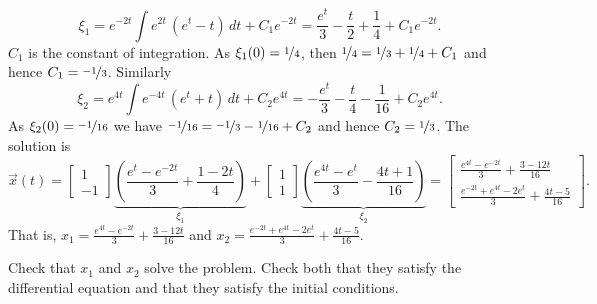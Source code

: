 \documentclass{ximera}
\begin{document}
\begin{exampleSol}
\begin{equation*}
    \xi_1 = e^{-2t}\int e^{2t} \, (e^t-t) \, dt + C_1 e^{-2t} = \frac{e^t}{3}-\frac{t}{2}+\frac{1}{4}+C_1 e^{-2t} .
    \end{equation*}
    $C_1$ is the constant of integration. As $\xi_1(0) = \nicefrac{1}{4}$, then $\nicefrac{1}{4}= \nicefrac{1}{3} + \nicefrac{1}{4} + C_1$ and hence $C_1 = \nicefrac{-1}{3}$. Similarly
    \begin{equation*}
        \xi_2 = e^{4t}\int e^{-4t} \, (e^t+ t) \, dt + C_2 e^{4t} = -\frac{e^t}{3}-\frac{t}{4}-\frac{1}{16} + C_2 e^{4t} .
    \end{equation*}
    As $\xi_2(0) = \nicefrac{-1}{16}$ we have $\nicefrac{-1}{16}= \nicefrac{-1}{3} -\nicefrac{1}{16} + C_2$ and hence $C_2 = \nicefrac{1}{3}$. The solution is
    \begin{equation*}
        \vec{x}(t)=
        \begin{bmatrix}
            1 \\
            -1
        \end{bmatrix}
        \underbrace{
            \left( \frac{e^t-e^{-2t}}{3}+\frac{1-2t}{4} \right)
        }%
        _{\xi_1} +
        \begin{bmatrix}
            1 \\
            1
        \end{bmatrix}
        \underbrace{
            \left( \frac{e^{4t}-e^t}{3}-\frac{4t+1}{16} \right)
        }%
        _{\xi_2} =
        \begin{bmatrix}
            \frac{e^{4t}-e^{-2t}}{3}+\frac{3-12t}{16} \\
            \frac{e^{-2t}+e^{4t}-2e^t}{3}+\frac{4t-5}{16}
        \end{bmatrix} .
    \end{equation*}
    That is, $x_1 = \frac{e^{4t}-e^{-2t}}{3}+\frac{3-12t}{16}$ and $x_2 = \frac{e^{-2t}+e^{4t}-2e^t}{3}+\frac{4t-5}{16}$.
\end{exampleSol}

\begin{exercise}
    Check that $x_1$ and $x_2$ solve the problem.  Check both that they satisfy the differential equation and that they satisfy the initial conditions.
\end{exercise}

\end{document}
